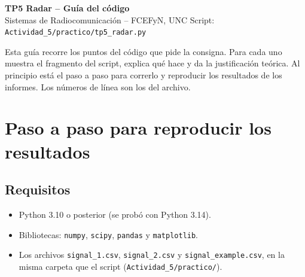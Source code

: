 \documentclass[11pt]{article}
\newcommand{\archivo}[1]{\texttt{#1}}
\begin{document}
{\LARGE\bfseries TP5 Radar -- Guía del código}\\[4pt]
Sistemas de Radiocomunicación -- FCEFyN, UNC \hfill Script: \archivo{Actividad\_5/practico/tp5\_radar.py}

\vspace{6pt}
Esta guía recorre los puntos del código que pide la consigna. Para cada uno muestra el fragmento del script, explica qué hace y da la justificación teórica. Al principio está el paso a paso para correrlo y reproducir los resultados de los informes. Los números de línea son los del archivo.

\tableofcontents

\section{Paso a paso para reproducir los resultados}

\subsection{Requisitos}
\begin{itemize}
  \item Python 3.10 o posterior (se probó con Python 3.14).
  \item Bibliotecas: \archivo{numpy}, \archivo{scipy}, \archivo{pandas} y \archivo{matplotlib}.
  \item Los archivos \archivo{signal\_1.csv}, \archivo{signal\_2.csv} y \archivo{signal\_example.csv}, en la misma carpeta que el script (\archivo{Actividad\_5/practico/}).
\end{itemize}
\end{document}
